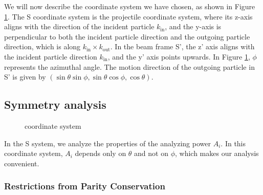 \documentclass[twocolumn,twoside,showpacs,preprintnumbers,superscriptaddress,amsmath,amssymb,prc]{revtex4}
\begin{document}
We will now describe the coordinate system we have chosen, as shown in Figure \ref{zuobiaoxi}. The S coordinate system is the projectile coordinate system, where its z-axis aligns with the direction of the incident particle $k_{\text{in}}$, and the y-axis is perpendicular to both the incident particle direction and the outgoing particle direction, which is along $k_{\text{in}} \times k_{\text{out}}$. In the beam frame S', the z' axis aligns with the incident particle direction $k_{\text{in}}$, and the y' axis points upwards. In Figure \ref{zuobiaoxi}, $\phi$ represents the azimuthal angle. The motion direction of the outgoing particle in S' is given by $(\sin \theta \sin \phi, \sin \theta \cos \phi, \cos \theta)$.



\subsection{Symmetry analysis}

\begin{figure}
\begin{center}
\end{center}
\caption{coordinate system}
\label{zuobiaoxi}
\end{figure}

In the S system, we analyze the properties of the analyzing power $A_i$. In this coordinate system, $A_i$ depends only on $\theta$ and not on $\phi$, which makes our analysis convenient.

\subsubsection{Restrictions from Parity Conservation}
\end{document}
